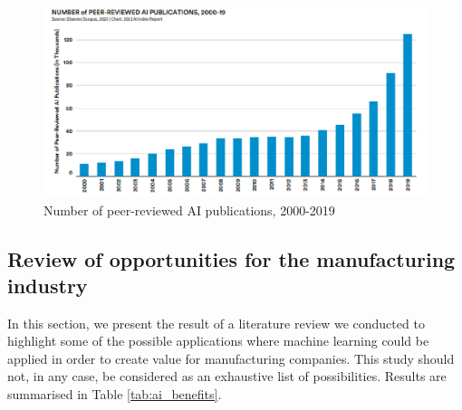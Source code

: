\begin{figure}
\centerline{\includegraphics[scale=0.9]{images/chapter_1/AI_report.eps}}
\caption{Number of peer-reviewed AI publications, 2000-2019 \citep{zhang2021ai}}
\label{fig:Number of Peer-Reviewed AI Publications}
\end{figure}


\subsection{Review of opportunities for the manufacturing industry}

In this section, we present the result of a literature review we conducted to highlight some of the possible applications where machine learning could be applied in order to create value for manufacturing companies. This study should not, in any case, be considered as an exhaustive list of possibilities. Results are summarised in Table \ref{tab:ai_benefits}. 

